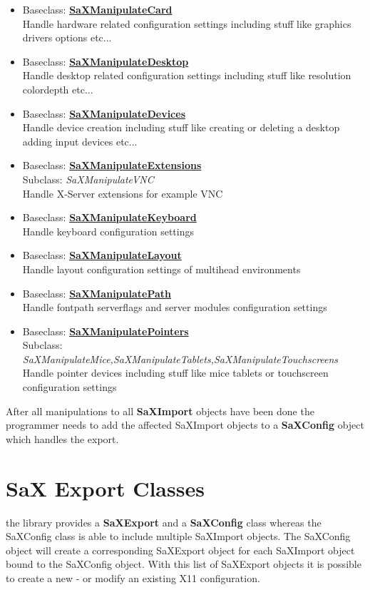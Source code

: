 \begin{itemize}
\item Baseclass: \textbf{\underline{SaXManipulateCard}}\\
      Handle hardware related configuration settings including
      stuff like graphics drivers options etc...
\item Baseclass: \textbf{\underline{SaXManipulateDesktop}}\\
      Handle desktop related configuration settings including
      stuff like resolution colordepth etc...
\item Baseclass: \textbf{\underline{SaXManipulateDevices}}\\
      Handle device creation including stuff like creating or
      deleting a desktop adding input devices etc...
\item Baseclass: \textbf{\underline{SaXManipulateExtensions}}\\
      Subclass:\hspace*{0.2cm} \textit{SaXManipulateVNC}\\
      Handle X-Server extensions for example VNC
\item Baseclass: \textbf{\underline{SaXManipulateKeyboard}}\\
      Handle keyboard configuration settings
\item Baseclass: \textbf{\underline{SaXManipulateLayout}}\\
      Handle layout configuration settings of multihead
      environments
\item Baseclass: \textbf{\underline{SaXManipulatePath}}\\
      Handle fontpath serverflags and server modules configuration settings
\item Baseclass: \textbf{\underline{SaXManipulatePointers}}\\
      Subclass:\hspace*{0.2cm} \textit{SaXManipulateMice,SaXManipulateTablets,SaXManipulateTouchscreens}\\
      Handle pointer devices including stuff like mice tablets or
      touchscreen configuration settings
\end{itemize}
 
After all manipulations to all \textbf{SaXImport} objects have been done
the programmer needs to add the affected SaXImport objects to a
\textbf{SaXConfig} object which handles the export. 

\section{SaX Export Classes}
the library provides a \textbf{SaXExport} and a \textbf{SaXConfig} class
whereas the SaXConfig class is able to include multiple SaXImport objects.
The SaXConfig object will create a corresponding SaXExport object for each
SaXImport object bound to the SaXConfig object. With this list of SaXExport
objects it is possible to create a new - or modify an existing X11
configuration.

